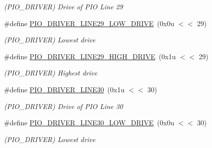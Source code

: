 \begin{DoxyCompactItemize}
\begin{DoxyCompactList}\small\item\em (P\+I\+O\+\_\+\+D\+R\+I\+V\+ER) Drive of P\+IO Line 29 \end{DoxyCompactList}\item 
\mbox{\label{group__SAMS70__PIO_gaeecaf91d3616669a6689234bc22e7ebe}} 
\#define \mbox{\hyperlink{group__SAMS70__PIO_gaeecaf91d3616669a6689234bc22e7ebe}{P\+I\+O\+\_\+\+D\+R\+I\+V\+E\+R\+\_\+\+L\+I\+N\+E29\+\_\+\+L\+O\+W\+\_\+\+D\+R\+I\+VE}}~(0x0u $<$$<$ 29)
\begin{DoxyCompactList}\small\item\em (P\+I\+O\+\_\+\+D\+R\+I\+V\+ER) Lowest drive \end{DoxyCompactList}\item 
\mbox{\label{group__SAMS70__PIO_gaf51d196e5ff9962ee794fb5947af5386}} 
\#define \mbox{\hyperlink{group__SAMS70__PIO_gaf51d196e5ff9962ee794fb5947af5386}{P\+I\+O\+\_\+\+D\+R\+I\+V\+E\+R\+\_\+\+L\+I\+N\+E29\+\_\+\+H\+I\+G\+H\+\_\+\+D\+R\+I\+VE}}~(0x1u $<$$<$ 29)
\begin{DoxyCompactList}\small\item\em (P\+I\+O\+\_\+\+D\+R\+I\+V\+ER) Highest drive \end{DoxyCompactList}\item 
\mbox{\label{group__SAMS70__PIO_gaaeb8a8eaa1186c9e420d992160698b34}} 
\#define \mbox{\hyperlink{group__SAMS70__PIO_gaaeb8a8eaa1186c9e420d992160698b34}{P\+I\+O\+\_\+\+D\+R\+I\+V\+E\+R\+\_\+\+L\+I\+N\+E30}}~(0x1u $<$$<$ 30)
\begin{DoxyCompactList}\small\item\em (P\+I\+O\+\_\+\+D\+R\+I\+V\+ER) Drive of P\+IO Line 30 \end{DoxyCompactList}\item 
\mbox{\label{group__SAMS70__PIO_ga056de8768c93d529a84971215bd2f0c1}} 
\#define \mbox{\hyperlink{group__SAMS70__PIO_ga056de8768c93d529a84971215bd2f0c1}{P\+I\+O\+\_\+\+D\+R\+I\+V\+E\+R\+\_\+\+L\+I\+N\+E30\+\_\+\+L\+O\+W\+\_\+\+D\+R\+I\+VE}}~(0x0u $<$$<$ 30)
\begin{DoxyCompactList}\small\item\em (P\+I\+O\+\_\+\+D\+R\+I\+V\+ER) Lowest drive \end{DoxyCompactList}\item 

\end{DoxyCompactItemize}
